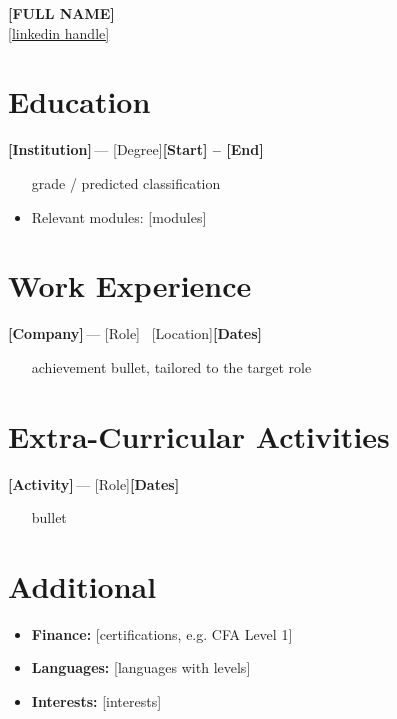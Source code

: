 \documentclass[10pt,a4paper]{article}
\newcommand{\entry}[3]{\needspace{3\baselineskip}\textbf{#1}\,#2\hfill\textbf{#3}\par\vspace{1pt}}
\begin{document}
\begin{center}
  {\LARGE\bfseries [FULL NAME]}\\[3pt]
  \href{[LINKEDIN URL]}{[linkedin handle]} \quad\textbar\quad [email] \quad\textbar\quad [phone]
\end{center}

\section{Education}
\entry{[Institution]}{— [Degree]}{[Start] -- [End]}
\begin{itemize}
  \item [grade / predicted classification]
  \item Relevant modules: [modules]
\end{itemize}

\section{Work Experience}
\entry{[Company]}{— [Role] \textbar\ [Location]}{[Dates]}
\begin{itemize}
  \item [achievement bullet, tailored to the target role]
\end{itemize}

\section{Extra-Curricular Activities}
\entry{[Activity]}{— [Role]}{[Dates]}
\begin{itemize}
  \item [bullet]
\end{itemize}

\section{Additional}
\begin{itemize}
  \item \textbf{Finance:} [certifications, e.g. CFA Level 1]
  \item \textbf{Languages:} [languages with levels]
  \item \textbf{Interests:} [interests]
\end{itemize}
\end{document}
